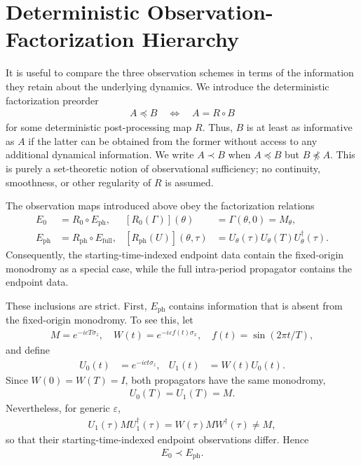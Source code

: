 \documentclass[twocolumn,prl,aps,floatfix]{revtex4-2}
\begin{document}
\section{Deterministic Observation-Factorization Hierarchy}

It is useful to compare the three observation schemes in terms of the information they retain about the underlying dynamics. We introduce the deterministic factorization preorder
\begin{align}
A\preceq B
\quad\Longleftrightarrow\quad
A=R\circ B
\end{align}
for some deterministic post-processing map $R$. Thus, $B$ is at least as informative as $A$ if the latter can be obtained from the former without access to any additional dynamical information. We write $A\prec B$ when $A\preceq B$ but $B\not\preceq A$. This is purely a set-theoretic notion of observational sufficiency; no continuity, smoothness, or other regularity of $R$ is assumed.

The observation maps introduced above obey the factorization relations
\begin{align}
E_0&=R_0\circ E_{\mathrm{ph}},
&
[R_0(\Gamma)](\theta)&=\Gamma(\theta,0)=M_\theta ,
\label{eq:factor_E0}
\\
E_{\mathrm{ph}}&=R_{\mathrm{ph}}\circ E_{\mathrm{full}},
&
[R_{\mathrm{ph}}(U)](\theta,\tau)
&=U_\theta(\tau)U_\theta(T)U_\theta^\dagger(\tau).
\label{eq:factor_Eph}
\end{align}
Consequently, the starting-time-indexed endpoint data contain the fixed-origin monodromy as a special case, while the full intra-period propagator contains the endpoint data.

These inclusions are strict. First, $E_{\mathrm{ph}}$ contains information that is absent from the fixed-origin monodromy. To see this, let
\begin{align}
M=e^{-icT\sigma_z},
\quad
W(t)=e^{-i\varepsilon f(t)\sigma_x},
\quad
f(t)=\sin(2\pi t/T),
\end{align}
and define
\begin{align}
U_0(t)&=e^{-ict\sigma_z},
&
U_1(t)&=W(t)U_0(t).
\end{align}
Since $W(0)=W(T)=I$, both propagators have the same monodromy,
\begin{align}
U_0(T)=U_1(T)=M.
\end{align}
Nevertheless, for generic $\varepsilon$,
\begin{align}
U_1(\tau)MU_1^\dagger(\tau)
=
W(\tau)MW^\dagger(\tau)
\neq M,
\end{align}
so that their starting-time-indexed endpoint observations differ. Hence
\begin{align}
E_0\prec E_{\mathrm{ph}}.
\end{align}
\end{document}
